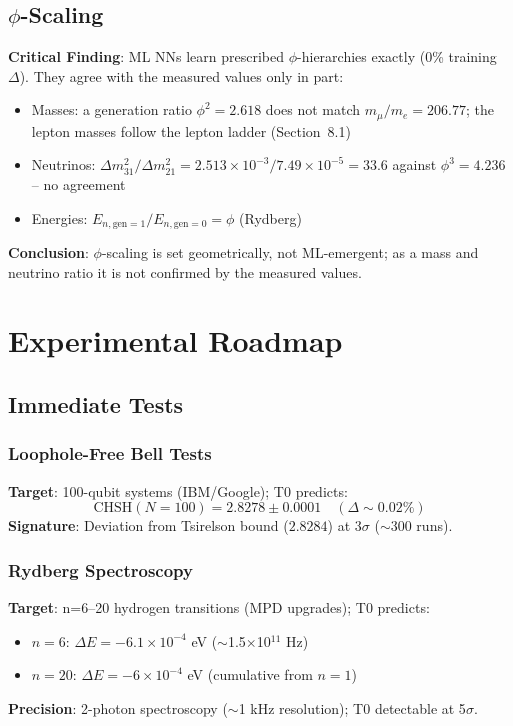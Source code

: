 	\subsection{$\phi$-Scaling}
	
	\textbf{Critical Finding}: ML NNs learn prescribed $\phi$-hierarchies exactly (0\% training $\Delta$). They agree with the measured values only in part:
	\begin{itemize}
		\item Masses: a generation ratio $\phi^2 = 2.618$ does not match $m_\mu/m_e = 206.77$; the lepton masses follow the lepton ladder (Section~8.1)
		\item Neutrinos: $\Delta m_{31}^2/\Delta m_{21}^2 = 2.513\times10^{-3}/7.49\times10^{-5} = 33.6$ against $\phi^3 = 4.236$ -- no agreement
		\item Energies: $E_{n,\text{gen}=1} / E_{n,\text{gen}=0} = \phi$ (Rydberg)
	\end{itemize}
	\textbf{Conclusion}: $\phi$-scaling is set geometrically, not ML-emergent; as a mass and neutrino ratio it is not confirmed by the measured values.
	
	\section{Experimental Roadmap}
	
	\subsection{Immediate Tests}
	
	\subsubsection{Loophole-Free Bell Tests}
	
	\textbf{Target}: 100-qubit systems (IBM/Google); T0 predicts:
	\begin{equation}
		\text{CHSH}(N=100) = 2.8278 \pm 0.0001 \quad (\Delta \sim 0.02\%) \tag{ML-Eq.~6.1}
	\end{equation}
	\textbf{Signature}: Deviation from Tsirelson bound ($2.8284$) at $3\sigma$ ($\sim300$ runs).
	
	\subsubsection{Rydberg Spectroscopy}
	
	\textbf{Target}: n=6--20 hydrogen transitions (MPD upgrades); T0 predicts:
	\begin{itemize}
		\item $n=6$: $\Delta E = -6.1\times10^{-4}$ eV ($\sim$1.5$\times$10$^{11}$ Hz)
		\item $n=20$: $\Delta E = -6\times10^{-4}$ eV (cumulative from $n=1$)
	\end{itemize}
	\textbf{Precision}: 2-photon spectroscopy ($\sim$1 kHz resolution); T0 detectable at 5$\sigma$.
	
